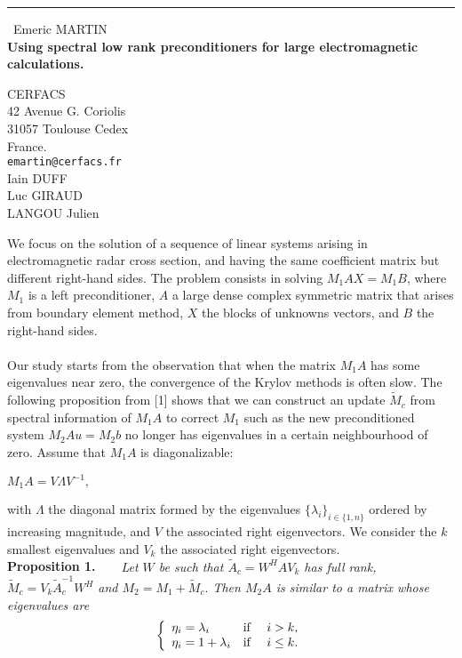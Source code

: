 \documentclass{report}
\begin{document}
\begin{center}
\rule{6in}{1pt} \
{\large Emeric MARTIN \\
{\bf Using spectral low rank preconditioners for large electromagnetic calculations.}}

CERFACS \\ 42 Avenue G. Coriolis \\ 31057 Toulouse Cedex \\ France.
\\
{\tt emartin@cerfacs.fr}\\
Iain DUFF\\
Luc GIRAUD\\
	LANGOU Julien\end{center}

We focus on the solution of a sequence of linear systems arising in
electromagnetic radar cross section, and having the same
coefficient matrix but different right-hand sides.
The problem consists in solving $M_{1}AX=M_{1}B$, where $M_{1}$ is a left
preconditioner, $A$ a large dense complex symmetric matrix that arises
from boundary element method, $X$ the blocks of unknowns vectors, and $B$
the right-hand sides.\\
\\
Our study starts from the observation that when the matrix $M_{1}A$ has
some eigenvalues near zero, the convergence
of the Krylov methods is often slow. The following proposition from [1]
shows that we can construct an update ${\tilde{M}}_c$ from spectral
information of $M_1A$ to correct $M_1$ such as the new preconditioned
system $M_{2}Au = M_{2}b$ no longer has eigenvalues in a certain
neighbourhood of zero.
Assume that $M_1A$ is diagonalizable:
\begin{center}
$M_1A = V\Lambda V^{-1},$
\end{center}
with $\Lambda$ the diagonal matrix formed by the eigenvalues
${\{\lambda_i\}}_{i\in\{1,n\}}$ ordered by increasing magnitude, and
$V$ the associated right eigenvectors. We consider the $k$ smallest
eigenvalues and $V_k$ the associated right eigenvectors.\\
{\bf Proposition 1.~~~}
{\it Let $W$ be such that
$\tilde{A}_c = W^H A V_k $ has full rank,
$ {\tilde{M}}_c = V_k \tilde{A}_c^{-1} W^{H} $ and
$ M_2 = M_1 + {\tilde{M}}_c.$
Then $M_{2}A$ is similar to a matrix whose eigenvalues are
$$
\left \{
\begin{array}{l l l}
\eta_i = \lambda_i & \mbox{\rm if } & i > k , \\
\eta_i = 1 + \lambda_i & \mbox{\rm if } & i \leq k . \\
\end{array}
\right .
$$
}
\end{document}
